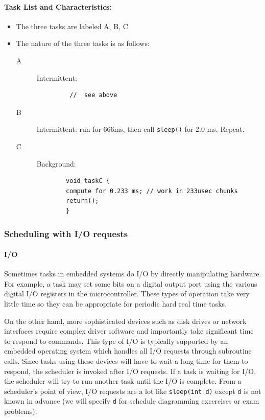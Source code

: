 \documentclass{article}	%
\begin{document}
\paragraph{Task List and Characteristics:}  
	\begin{itemize}
	\item The three tasks are labeled A, B, C
	\item The nature of the three tasks is as follows:
		\begin{description}
		\item [A] Intermittent:
		\begin{verbatim}
		 //  see above
		\end{verbatim}
		\item [B] Intermittent:  run for 666ms, then call {\tt sleep()} for 2.0 ms.  Repeat.
		\item [C] Background:
		\begin{verbatim}
		void taskC {
		compute for 0.233 ms; // work in 233usec chunks
		return();
		}
		\end{verbatim}
		\end{description} 
	\end{itemize}

 
  
\subsubsection*{Scheduling with I/O requests} 
\paragraph{I/O}
Sometimes tasks in embedded systems do I/O by directly manipulating
hardware. For example, a task may set some bits on a digital output
port using the various digital I/O registers in the microcontroller.  These types of operation  take
very little time so they can be appropriate for periodic hard real time tasks.


On the other hand, more sophisticated devices such as  disk drives or network
interfaces require complex driver
software and importantly take significant time to respond to commands.
This type of I/O is typically supported by an embedded operating system
which handles all I/O requests through subroutine calls.  Since tasks
using these devices will have to wait a long time for them to respond, the scheduler
is invoked after I/O requests.  If a task is waiting for I/O, the
scheduler will try to run another task until the I/O is complete.
From a scheduler's point of view, I/O requests are a lot like {\tt sleep(int d)} except {\tt d} is not known in advance (we will specify {\tt d} for schedule diagramming excercises or exam problems). 
\end{document}
